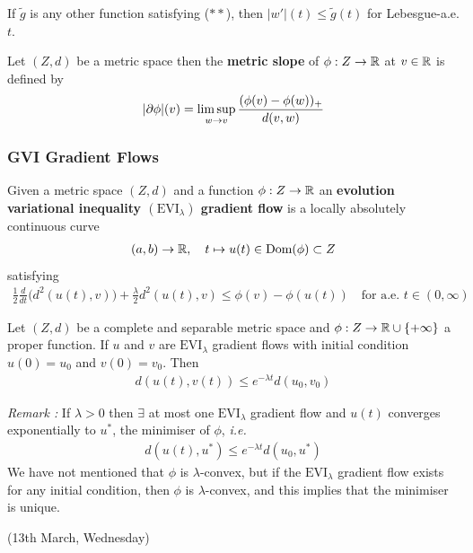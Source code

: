 \documentclass[12pt,a4paper]{article}
\begin{document}
\quad If $\tilde{g}$ is any other function satisfying ($**$), then $|w'|(t) \leq \tilde{g}(t)$ for Lebesgue-a.e. $t$.
\s

 Let $(Z,d)$ be a metric space then the \textbf{metric slope} of $\phi : Z\rightarrow \mathbb{R}$ at $v\in \mathbb{R}$ is defined by
\begin{align*}
|\partial \phi|(v) = \limsup_{w\rightarrow v} \frac{(\phi(v)- \phi(w))_+}{d(v,w)}
\end{align*}
\s

\subsubsection{GVI Gradient Flows}

 Given a metric space $(Z,d)$ and a function $\phi : Z\rightarrow \mathbb{R}$ an \textbf{evolution variational inequality $(\text{EVI}_{\lambda})$ gradient flow} is a locally absolutely continuous curve
\begin{align*}
(a,b) \rightarrow \mathbb{R}, \quad t\mapsto u(t) \in \text{Dom}(\phi) \subset Z
\end{align*}
satisfying
\begin{align*}
\frac{1}{2}\frac{d}{dt}\Big( d^2(u(t), v) \Big) + \frac{\lambda}{2} d^2(u(t), v) \leq \phi(v)- \phi(u(t)) \quad \text{for a.e. }t \in (0, \infty)
\end{align*}
\s

 Let $(Z,d)$ be a complete and separable metric space and $\phi : Z\rightarrow \mathbb{R} \cup \{+ \infty\}$ a proper function. If $u$ and $v$ are $\text{EVI}_{\lambda}$ gradient flows with initial condition $u(0) = u_0$ and $v(0) = v_0$. Then
\begin{align*}
d(u(t), v(t)) \leq e^{-\lambda t} d(u_0, v_0)
\end{align*}
\s

\emph{Remark :} If $\lambda >0$ then $\exists$ at most one $\text{EVI}_{\lambda}$ gradient flow and $u(t)$ converges exponentially to $u^*$, the minimiser of $\phi$, \textit{i.e.}
\begin{align*}
d(u(t), u^*) \leq e^{-\lambda t} d(u_0, u^*)
\end{align*}
We have not mentioned that $\phi$ is $\lambda$-convex, but if the $\text{EVI}_{\lambda}$ gradient flow exists for any initial condition, then $\phi$ is $\lambda$-convex, and this implies that the minimiser is unique.
\s

\newday

(13th March, Wednesday)
\s
\end{document}
